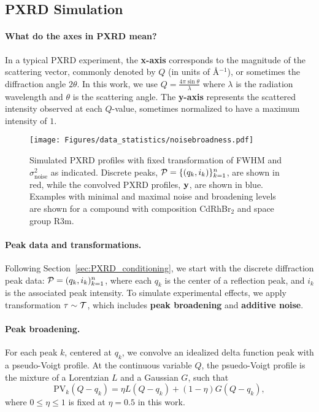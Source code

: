 \subsection{PXRD Simulation}\label{sup-sec:pxrd_simulation}

\paragraph{What do the axes in PXRD mean?} In a typical PXRD experiment, the \textbf{x-axis} corresponds to the magnitude of the scattering vector, commonly denoted by $Q$ (in units of Å$^{-1}$), or sometimes the diffraction angle $2\theta$. In this work, we use $Q =\tfrac{4\pi\sin\theta}{\lambda}$ where $\lambda$ is the radiation wavelength and $\theta$ is the scattering angle. The \textbf{y-axis} represents the scattered intensity observed at each $Q$-value, sometimes normalized to have a maximum intensity of $1$.

\begin{figure}[t]
\begin{center}
\centerline{\texttt{[image: Figures/data\_statistics/noisebroadness.pdf]}}
\caption{Simulated PXRD profiles with fixed transformation of FWHM and $\sigma_{\mathrm{noise}}^2$ as indicated. Discrete peaks, ${\mathcal P} = \{(q_k,i_k)\}_{k=1}^n$, are shown in red, while the convolved PXRD profiles, ${\mathbf y}$, are shown in blue. Examples with minimal and maximal noise and broadening levels are shown for a compound with composition CdRhBr$_2$ and space group R3m.
}
\label{noise_broadeness_levels}
\end{center}
\vspace{-0.5cm}
\end{figure}

\paragraph{Peak data and transformations.} Following Section~\ref{sec:PXRD_conditioning}, we start with the discrete diffraction peak data: ${\mathcal P} = {(q_k, i_k)_{k=1}^n}$, where each $q_k$ is the center of a reflection peak, and $i_k$ is the associated peak intensity. To simulate experimental effects, we apply transformation $\tau\sim{\mathcal T}$, which includes \textbf{peak broadening} and \textbf{additive noise}.

\paragraph{Peak broadening.} For each peak $k$, centered at $q_k$, we convolve an idealized delta function peak with a pseudo-Voigt profile. At the continuous variable $Q$, the psuedo-Voigt profile is the mixture of a Lorentzian $L$ and a Gaussian $G$, such that
\begin{equation}
    \mathrm{PV}_k(Q - q_k) = \eta L(Q - q_k) + (1 - \eta) G(Q - q_k),
\end{equation}
where $0 \leq \eta \leq 1$ is fixed at $\eta = 0.5$ in this work. 

